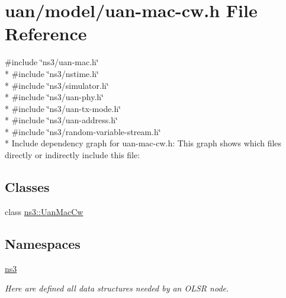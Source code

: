\hypertarget{uan-mac-cw_8h}{}\section{uan/model/uan-\/mac-\/cw.h File Reference}
\label{uan-mac-cw_8h}
{\ttfamily \#include \char`\"{}ns3/uan-\/mac.\+h\char`\"{}}\\*
{\ttfamily \#include \char`\"{}ns3/nstime.\+h\char`\"{}}\\*
{\ttfamily \#include \char`\"{}ns3/simulator.\+h\char`\"{}}\\*
{\ttfamily \#include \char`\"{}ns3/uan-\/phy.\+h\char`\"{}}\\*
{\ttfamily \#include \char`\"{}ns3/uan-\/tx-\/mode.\+h\char`\"{}}\\*
{\ttfamily \#include \char`\"{}ns3/uan-\/address.\+h\char`\"{}}\\*
{\ttfamily \#include \char`\"{}ns3/random-\/variable-\/stream.\+h\char`\"{}}\\*
Include dependency graph for uan-\/mac-\/cw.h\+:
This graph shows which files directly or indirectly include this file\+:
\subsection*{Classes}
\begin{DoxyCompactItemize}
\item 
class \hyperlink{classns3_1_1UanMacCw}{ns3\+::\+Uan\+Mac\+Cw}
\end{DoxyCompactItemize}
\subsection*{Namespaces}
\begin{DoxyCompactItemize}
\item 
 \hyperlink{namespacens3}{ns3}
\begin{DoxyCompactList}\small\item\em Here are defined all data structures needed by an O\+L\+SR node. \end{DoxyCompactList}\end{DoxyCompactItemize}
